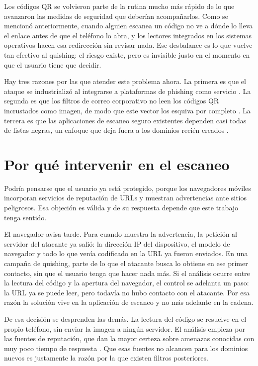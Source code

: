 \label{chap:justificacion}
Los códigos QR se volvieron parte de la rutina mucho más rápido de lo que avanzaron las medidas de seguridad que deberían acompañarlos. Como se mencionó anteriormente, cuando alguien escanea un código no ve a dónde lo lleva el enlace antes de que el teléfono lo abra, y los lectores integrados en los sistemas operativos hacen esa redirección sin revisar nada. Ese desbalance es lo que vuelve tan efectivo al quishing: el riesgo existe, pero es invisible justo en el momento en que el usuario tiene que decidir.

Hay tres razones por las que atender este problema ahora. La primera es que el ataque se industrializó al integrarse a plataformas de phishing como servicio \cite{insikt2024qrcode}. La segunda es que los filtros de correo corporativo no leen los códigos QR incrustados como imagen, de modo que este vector los esquiva por completo \cite{unit42_2023qr}. La tercera es que las aplicaciones de escaneo seguro existentes dependen casi todas de listas negras, un enfoque que deja fuera a los dominios recién creados \cite{sheng2009empirical,apwg2024q1,apwg2025q1}.

\section{Por qué intervenir en el escaneo}

Podría pensarse que el usuario ya está protegido, porque los navegadores móviles incorporan servicios de reputación de URLs y muestran advertencias ante sitios peligrosos. Esa objeción es válida y de su respuesta depende que este trabajo tenga sentido.

El navegador avisa tarde. Para cuando muestra la advertencia, la petición al servidor del atacante ya salió: la dirección IP del dispositivo, el modelo de navegador y todo lo que venía codificado en la URL ya fueron enviados. En una campaña de quishing, parte de lo que el atacante busca lo obtiene en ese primer contacto, sin que el usuario tenga que hacer nada más. Si el análisis ocurre entre la lectura del código y la apertura del navegador, el control se adelanta un paso: la URL ya se puede leer, pero todavía no hubo contacto con el atacante. Por esa razón la solución vive en la aplicación de escaneo y no más adelante en la cadena.

De esa decisión se desprenden las demás. La lectura del código se resuelve en el propio teléfono, sin enviar la imagen a ningún servidor. El análisis empieza por las fuentes de reputación, que dan la mayor certeza sobre amenazas conocidas con muy poco tiempo de respuesta \cite{google_safebrowsing,phishtank_devinfo}. Que esas fuentes no alcancen para los dominios nuevos es justamente la razón por la que existen filtros posteriores.

